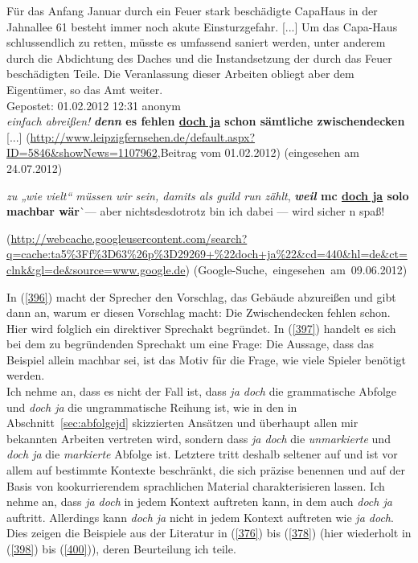 \begin{exe}
	\ex\label{396}

	Für das Anfang Januar durch ein Feuer stark beschädigte CapaHaus in der Jahnallee 61 besteht immer noch akute Einsturzgefahr. [...] 
	Um das Capa-Haus schlussendlich zu retten, müsste es umfassend saniert werden, unter anderem durch die Abdichtung des Daches und die Instandsetzung 		der durch das Feuer beschädigten Teile. Die Veranlassung dieser Arbeiten obliegt aber dem Eigentümer, so das Amt weiter.\\
	Gepostet: 01.02.2012 12:31 anonym\\
	\emph{einfach abreißen!} 
	\textbf{\textit{denn} es fehlen \underline{doch ja} schon sämtliche zwischen\linebreak decken} [...] 		
	\newline
	{\scriptsize(\url{http://www.leipzigfernsehen.de/default.aspx?ID=5846\&showNews=1107962},\linebreak Beitrag vom 01.02.2012) (eingesehen am 24.07.2012)}
	\hfill\hbox{\citet[176]{Mueller2014a}}
\end{exe}        
\pagebreak
\begin{exe}
	\ex\label{397}

	\emph{zu „wie vielt“ müssen wir sein, damits als guild run zählt}, \textbf{\textit{weil} mc \underline{doch ja} solo machbar wär}^^ --- aber 	nichtsdesdotrotz bin ich dabei --- wird sicher n 	spaß!
	\begin{sloppypar}
	{\scriptsize(\url{http://webcache.googleusercontent.com/search?q=cache:ta5\%3Ff\%3D63\%26p\%3D29269+\%22doch+ja\%22\&cd=440\&hl=de\&ct=clnk\&gl=de\&source=www.google.de})}
	\newline
	\hbox{}\hfill\hbox{(Google-Suche, eingesehen am 09.06.2012)}\end{sloppypar}
\end{exe} 
In (\ref{396}) macht der Sprecher den Vorschlag, das Gebäude abzureißen und gibt dann an, warum er diesen Vorschlag macht: Die Zwischendecken fehlen schon. Hier wird folglich ein direktiver Sprechakt begründet. In (\ref{397}) handelt es sich bei dem zu begründenden Sprechakt um eine Frage: Die Aussage, dass das Beispiel allein machbar sei, ist das Motiv für die Frage, wie viele Spieler benötigt werden.\\

\noindent	
Ich nehme an, dass es nicht der Fall ist, dass \textit{ja doch} die grammatische Abfolge und \textit{doch ja} die ungrammatische Reihung ist, wie in den in Abschnitt~\ref{sec:abfolgejd} skizzier\-ten Ansätzen und überhaupt allen mir bekannten Arbeiten vertreten wird, sondern dass \textit{ja doch} die \emph{unmarkierte} und \textit{doch ja} die \emph{markierte} Abfolge ist. Letztere tritt deshalb seltener auf und ist vor allem auf bestimmte Kontexte beschränkt, die sich präzise benennen und auf der Basis von kookurrierendem sprachlichen Material charakterisieren lassen. Ich nehme an, dass \textit{ja doch} in jedem Kontext auftreten kann, in dem auch \textit{doch ja} auftritt. Allerdings kann \textit{doch ja} nicht in jedem Kontext auftreten wie \textit{ja doch}. Dies zeigen die Beispiele aus der Literatur in (\ref{376}) bis (\ref{378}) (hier wiederholt in (\ref{398}) bis (\ref{400})), deren Beurteilung ich teile.

